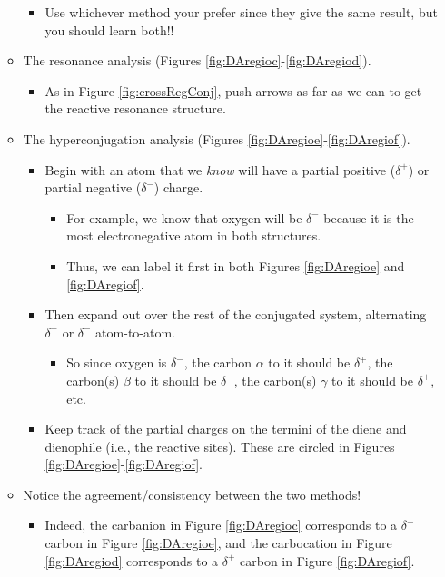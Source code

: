 \documentclass[../notes.tex]{subfiles}
\begin{document}
\begin{itemize}
\begin{itemize}
\begin{itemize}
            \item Use whichever method your prefer since they give the same result, but you should learn both!!
        \end{itemize}
        \item The resonance analysis (Figures \ref{fig:DAregioc}-\ref{fig:DAregiod}).
        \begin{itemize}
            \item As in Figure \ref{fig:crossRegConj}, push arrows as far as we can to get the reactive resonance structure.
        \end{itemize}
        \item The hyperconjugation analysis (Figures \ref{fig:DAregioe}-\ref{fig:DAregiof}).
        \begin{itemize}
            \item Begin with an atom that we \emph{know} will have a partial positive ($\delta^+$) or partial negative ($\delta^-$) charge.
            \begin{itemize}
                \item For example, we know that oxygen will be $\delta^-$ because it is the most electronegative atom in both structures.
                \item Thus, we can label it first in both Figures \ref{fig:DAregioe} and \ref{fig:DAregiof}.
            \end{itemize}
            \item Then expand out over the rest of the conjugated system, alternating $\delta^+$ or $\delta^-$ atom-to-atom.
            \begin{itemize}
                \item So since oxygen is $\delta^-$, the carbon $\alpha$ to it should be $\delta^+$, the carbon(s) $\beta$ to it should be $\delta^-$, the carbon(s) $\gamma$ to it should be $\delta^+$, etc.
            \end{itemize}
            \item Keep track of the partial charges on the termini of the diene and dienophile (i.e., the reactive sites). These are circled in Figures \ref{fig:DAregioe}-\ref{fig:DAregiof}.
        \end{itemize}
        \item Notice the agreement/consistency between the two methods!
        \begin{itemize}
            \item Indeed, the carbanion in Figure \ref{fig:DAregioc} corresponds to a $\delta^-$ carbon in Figure \ref{fig:DAregioe}, and the carbocation in Figure \ref{fig:DAregiod} corresponds to a $\delta^+$ carbon in Figure \ref{fig:DAregiof}.

\end{itemize}
\end{itemize}
\end{itemize}
\end{document}
